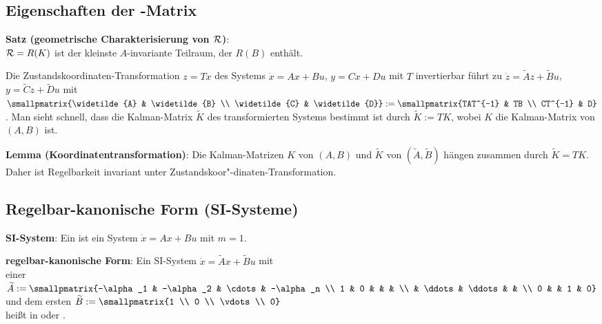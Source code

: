 \pagebreak

\subsection{%
    Eigenschaften der -Matrix%
}

\textbf{Satz (geometrische Charakterisierung von $\mathcal{R}$)}:\\
$\mathcal{R} = R(K)$ ist der kleinste $A$-invariante Teilraum, der $R(B)$ enthält.

\linie

Die Zustandskoordinaten-Transformation $z = Tx$ des
Systems $\dot{x} = Ax + Bu$, $y = Cx + Du$ mit $T$ invertierbar führt zu
$\dot{z} = \widetilde{A} z + \widetilde{B} u$, $y = \widetilde{C} z + \widetilde{D} u$
mit $\smallpmatrix{\widetilde{A} & \widetilde{B} \\ \widetilde{C} & \widetilde{D}}
:= \smallpmatrix{TAT^{-1} & TB \\ CT^{-1} & D}$.
Man sieht schnell, dass die Kalman-Matrix $\widetilde{K}$ des transformierten Systems
bestimmt ist durch $\widetilde{K} := TK$, wobei $K$ die Kalman-Matrix von $(A, B)$ ist.

\textbf{Lemma (Koordinatentransformation)}:
Die Kalman-Matrizen $K$ von $(A, B)$ und $\widetilde{K}$ von $(\widetilde{A}, \widetilde{B})$
hängen zusammen durch $\widetilde{K} = TK$.
Daher ist Regelbarkeit invariant unter Zustandskoor"-dinaten-Transformation.

\subsection{%
    Regelbar-kanonische Form (SI-Systeme)%
}

\textbf{SI-System}:
Ein  ist ein System $\dot{x} = Ax + Bu$ mit $m = 1$.

\linie

\textbf{regelbar-kanonische Form}:
Ein SI-System $\dot{x} = \widetilde{A}x + \widetilde{B}u$ mit\\
einer 
$\widetilde{A} := \smallpmatrix{-\alpha_1 & -\alpha_2 & \cdots & -\alpha_n \\
1 & 0 & & & \\ & \ddots & \ddots & & \\ 0 & & 1 & 0}$
und dem ersten  $\widetilde{B} := \smallpmatrix{1 \\ 0 \\ \vdots \\ 0}$\\
heißt in 
oder .

